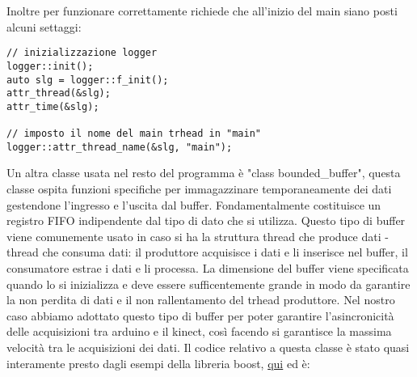 \documentclass[10pt,a4paper]{article}
\begin{document}
Inoltre per funzionare correttamente richiede che all'inizio del main siano posti alcuni settaggi:
\begin{lstlisting}[style=mycpp, caption=librerie usate, captionpos=b]
// inizializzazione logger
logger::init();
auto slg = logger::f_init();
attr_thread(&slg);
attr_time(&slg);

// imposto il nome del main trhead in "main"
logger::attr_thread_name(&slg, "main");
\end{lstlisting}
%
%
Un altra classe usata nel resto del programma \`e "class bounded\_buffer", questa classe ospita funzioni specifiche per immagazzinare temporaneamente dei dati gestendone l'ingresso e l'uscita dal buffer. Fondamentalmente costituisce un registro FIFO indipendente dal tipo di dato che si utilizza. Questo tipo di buffer viene comunemente usato in caso si ha la struttura thread che produce dati - thread che consuma dati: il produttore acquisisce i dati e li inserisce nel buffer, il consumatore estrae i dati e li processa. La dimensione del buffer viene specificata quando lo si inizializza e deve essere sufficentemente grande in modo da garantire la non perdita di dati e il non rallentamento del trhead produttore. Nel nostro caso abbiamo adottato questo tipo di buffer per poter garantire l'asincronicit\`a delle acquisizioni tra arduino e il kinect, cos\`i facendo si garantisce la massima velocit\`a tra le acquisizioni dei dati. Il codice relativo a questa classe \`e stato quasi interamente presto dagli esempi della libreria boost, \href{https://www.boost.org/doc/libs/1_69_0/doc/html/circular_buffer/examples.html}{qui} ed \`e:
\end{document}
